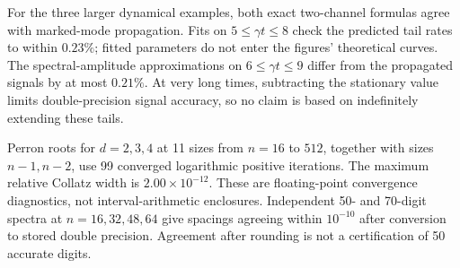 \documentclass[aps,pra,reprint,superscriptaddress,nofootinbib,floatfix]{revtex4-2}
\begin{document}
For the three larger dynamical examples, both exact two-channel formulas agree with marked-mode propagation. Fits on $5\le\gamma t\le8$ check the predicted tail rates to within $0.23\%$; fitted parameters do not enter the figures' theoretical curves. The spectral-amplitude approximations on $6\le\gamma t\le9$ differ from the propagated signals by at most $0.21\%$. At very long times, subtracting the stationary value limits double-precision signal accuracy, so no claim is based on indefinitely extending these tails.

Perron roots for $d=2,3,4$ at 11 sizes from $n=16$ to $512$, together with sizes $n-1,n-2$, use 99 converged logarithmic positive iterations. The maximum relative Collatz width is $2.00\times10^{-12}$. These are floating-point convergence diagnostics, not interval-arithmetic enclosures. Independent 50- and 70-digit spectra at $n=16,32,48,64$ give spacings agreeing within $10^{-10}$ after conversion to stored double precision. Agreement after rounding is not a certification of 50 accurate digits.


\end{document}
